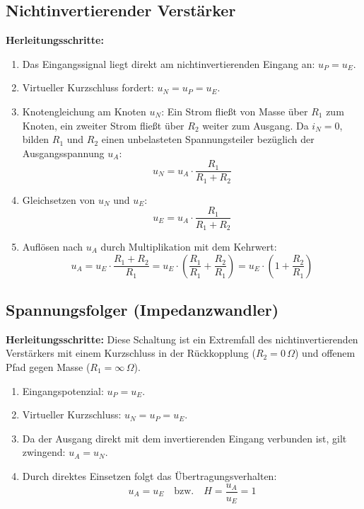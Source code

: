 \documentclass[11pt,a4paper]{article}
\begin{document}
\subsection{Nichtinvertierender Verstärker}
\textbf{Herleitungsschritte:}
\begin{enumerate}
    \item Das Eingangssignal liegt direkt am nichtinvertierenden Eingang an: $u_P = u_E$.
    \item Virtueller Kurzschluss fordert: $u_N = u_P = u_E$.
    \item Knotengleichung am Knoten $u_N$: Ein Strom fließt von Masse über $R_1$ zum Knoten, ein zweiter Strom fließt über $R_2$ weiter zum Ausgang. Da $i_N = 0$, bilden $R_1$ und $R_2$ einen unbelasteten Spannungsteiler bezüglich der Ausgangsspannung $u_A$:
    \begin{equation}
    u_N = u_A \cdot \frac{R_1}{R_1 + R_2}
    \end{equation}
    \item Gleichsetzen von $u_N$ und $u_E$:
    \begin{equation}
    u_E = u_A \cdot \frac{R_1}{R_1 + R_2}
    \end{equation}
    \item Auflösen nach $u_A$ durch Multiplikation mit dem Kehrwert:
    \begin{equation}
    u_A = u_E \cdot \frac{R_1 + R_2}{R_1} = u_E \cdot \left( \frac{R_1}{R_1} + \frac{R_2}{R_1} \right) = u_E \cdot \left( 1 + \frac{R_2}{R_1} \right)
    \end{equation}
\end{enumerate}

\subsection{Spannungsfolger (Impedanzwandler)}
\textbf{Herleitungsschritte:}
Diese Schaltung ist ein Extremfall des nichtinvertierenden Verstärkers mit einem Kurzschluss in der Rückkopplung ($R_2 = 0\,\Omega$) und offenem Pfad gegen Masse ($R_1 = \infty\,\Omega$).
\begin{enumerate}
    \item Eingangspotenzial: $u_P = u_E$.
    \item Virtueller Kurzschluss: $u_N = u_P = u_E$.
    \item Da der Ausgang direkt mit dem invertierenden Eingang verbunden ist, gilt zwingend: $u_A = u_N$.
    \item Durch direktes Einsetzen folgt das Übertragungsverhalten:
    \begin{equation}
    u_A = u_E \quad \text{bzw.} \quad H = \frac{u_A}{u_E} = 1
    \end{equation}
\end{enumerate}
\end{document}
